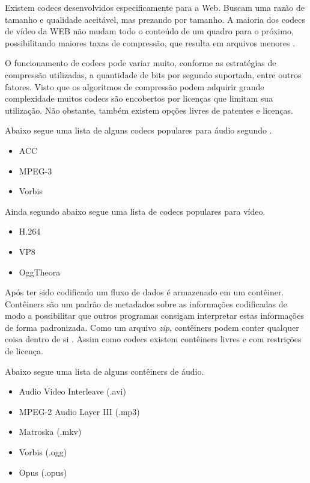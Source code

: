 Existem codecs desenvolvidos especificamente para a Web. Buscam uma
razão de tamanho e qualidade aceitável, mas prezando por tamanho. A
maioria dos codecs de vídeo da WEB não mudam todo o conteúdo de um quadro
para o próximo, possibilitando maiores taxas de compressão, que
resulta em arquivos menores \autocite{diveIntohtml}.

O funcionamento de codecs pode variar muito, conforme as estratégias
de compressão utilizadas, a quantidade de bits por segundo suportada,
entre outros fatores. Visto que os algoritmos de compressão podem
adquirir grande complexidade muitos codecs são encobertos por licenças
que limitam sua utilização. Não obstante, também existem opções
livres de patentes e licenças.

Abaixo segue uma lista de alguns codecs populares para áudio segundo \cite[pp. 67]{proHtml5}.

\begin{itemize}
    \item ACC
    \item MPEG-3
    \item Vorbis
\end{itemize}

Ainda segundo \cite[pp. 67]{proHtml5} abaixo segue uma lista de codecs populares para vídeo.
\begin{itemize}
    \item H.264
    \item VP8
    \item OggTheora
\end{itemize}

Após ter sido codificado um fluxo de dados é armazenado em um
contêiner. Contêiners são um padrão de metadados sobre as
informações codificadas de modo a possibilitar que outros programas
consigam interpretar estas informações de forma padronizada. Como um
arquivo \textit{zip}, contêiners podem conter qualquer coisa dentro de
si \autocite{diveIntohtml}. Assim como codecs existem contêiners livres
e com restrições de licença.

Abaixo segue uma lista de alguns contêiners de áudio.
\begin{itemize}
    \item Audio Video Interleave (.avi)
    \item MPEG-2 Audio Layer III (.mp3)
    \item Matroska (.mkv)
    \item Vorbis (.ogg)
    \item Opus (.opus)
\end{itemize}

